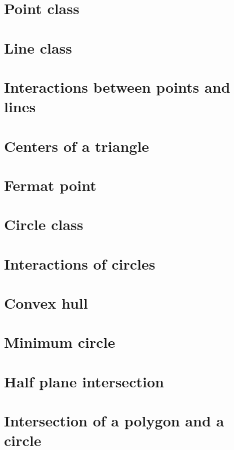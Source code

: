\documentclass[UTF8,a4paper]{report}
\begin{document}
		\section{Point class}
			
		\section{Line class}
			
		\section{Interactions between points and lines}
			
		\section{Centers of a triangle}
			
		\section{Fermat point}
			
		\section{Circle class}
			
		\section{Interactions of circles}
			
		\section{Convex hull}
			
		\section{Minimum circle}
			
		\section{Half plane intersection}
			
		\section{Intersection of a polygon and a circle}
			
\end{document}
